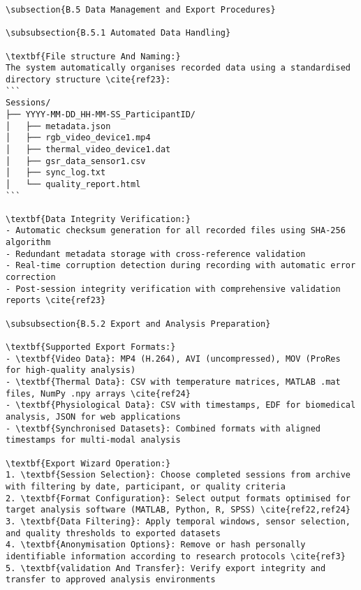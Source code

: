 \begin{verbatim}
\subsection{B.5 Data Management and Export Procedures}

\subsubsection{B.5.1 Automated Data Handling}

\textbf{File structure And Naming:}
The system automatically organises recorded data using a standardised directory structure \cite{ref23}:
```
Sessions/
├── YYYY-MM-DD_HH-MM-SS_ParticipantID/
│   ├── metadata.json
│   ├── rgb_video_device1.mp4
│   ├── thermal_video_device1.dat
│   ├── gsr_data_sensor1.csv
│   ├── sync_log.txt
│   └── quality_report.html
```

\textbf{Data Integrity Verification:}
- Automatic checksum generation for all recorded files using SHA-256 algorithm
- Redundant metadata storage with cross-reference validation
- Real-time corruption detection during recording with automatic error correction
- Post-session integrity verification with comprehensive validation reports \cite{ref23}

\subsubsection{B.5.2 Export and Analysis Preparation}

\textbf{Supported Export Formats:}
- \textbf{Video Data}: MP4 (H.264), AVI (uncompressed), MOV (ProRes for high-quality analysis)
- \textbf{Thermal Data}: CSV with temperature matrices, MATLAB .mat files, NumPy .npy arrays \cite{ref24}
- \textbf{Physiological Data}: CSV with timestamps, EDF for biomedical analysis, JSON for web applications
- \textbf{Synchronised Datasets}: Combined formats with aligned timestamps for multi-modal analysis

\textbf{Export Wizard Operation:}
1. \textbf{Session Selection}: Choose completed sessions from archive with filtering by date, participant, or quality criteria
2. \textbf{Format Configuration}: Select output formats optimised for target analysis software (MATLAB, Python, R, SPSS) \cite{ref22,ref24}
3. \textbf{Data Filtering}: Apply temporal windows, sensor selection, and quality thresholds to exported datasets
4. \textbf{Anonymisation Options}: Remove or hash personally identifiable information according to research protocols \cite{ref3}
5. \textbf{validation And Transfer}: Verify export integrity and transfer to approved analysis environments


\end{verbatim}
